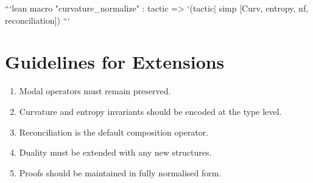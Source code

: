 ```lean
macro "curvature_normalize" : tactic =>
  `(tactic|
      simp [Curv, entropy, nf, reconciliation])
```

\section{Guidelines for Extensions}

\begin{enumerate}
\item Modal operators must remain preserved.
\item Curvature and entropy invariants should be encoded at the type level.
\item Reconciliation is the default composition operator.
\item Duality must be extended with any new structures.
\item Proofs should be maintained in fully normalised form.
\end{enumerate}

